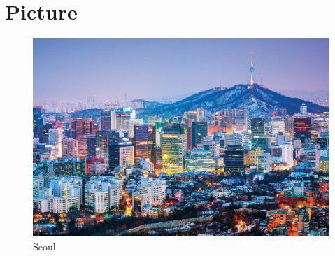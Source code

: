 \documentclass{article}
\begin{document}
\section{Picture}

\begin{figure}
  \includegraphics[width=\linewidth]{seoul.png}
  \caption{Seoul}
  \label{fig:seoul1}
\end{figure}
\end{document}
